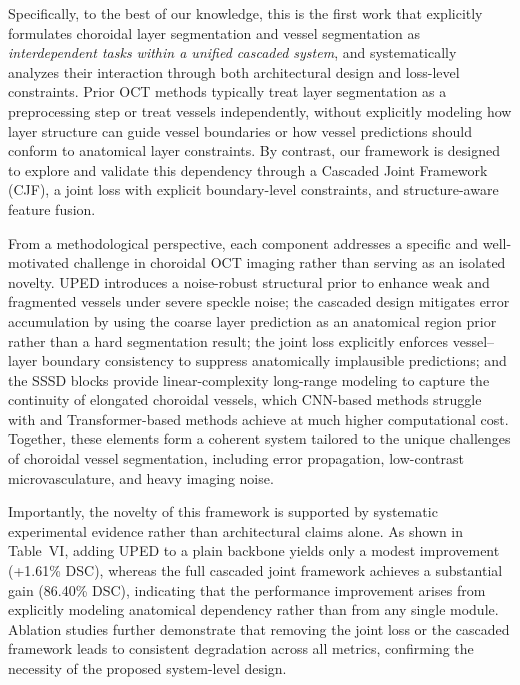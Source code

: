 \documentclass[11pt]{article}
\begin{document}
\begin{enumerate}
{    Specifically, to the best of our knowledge, this is the first work that explicitly formulates choroidal layer segmentation and vessel segmentation as \emph{interdependent tasks within a unified cascaded system}, and systematically analyzes their interaction through both architectural design and loss-level constraints.
    Prior OCT methods typically treat layer segmentation as a preprocessing step or treat vessels independently, without explicitly modeling how layer structure can guide vessel boundaries or how vessel predictions should conform to anatomical layer constraints.
    By contrast, our framework is designed to explore and validate this dependency through a Cascaded Joint Framework (CJF), a joint loss with explicit boundary-level constraints, and structure-aware feature fusion.
    
    From a methodological perspective, each component addresses a specific and well-motivated challenge in choroidal OCT imaging rather than serving as an isolated novelty.
    UPED introduces a noise-robust structural prior to enhance weak and fragmented vessels under severe speckle noise;
    the cascaded design mitigates error accumulation by using the coarse layer prediction as an anatomical region prior rather than a hard segmentation result;
    the joint loss explicitly enforces vessel–layer boundary consistency to suppress anatomically implausible predictions;
    and the SSSD blocks provide linear-complexity long-range modeling to capture the continuity of elongated choroidal vessels, which CNN-based methods struggle with and Transformer-based methods achieve at much higher computational cost.
    Together, these elements form a coherent system tailored to the unique challenges of choroidal vessel segmentation, including error propagation, low-contrast microvasculature, and heavy imaging noise.
    
    Importantly, the novelty of this framework is supported by systematic experimental evidence rather than architectural claims alone.
    As shown in Table~VI, adding UPED to a plain backbone yields only a modest improvement (+1.61\% DSC), whereas the full cascaded joint framework achieves a substantial gain (86.40\% DSC), indicating that the performance improvement arises from explicitly modeling anatomical dependency rather than from any single module.
    Ablation studies further demonstrate that removing the joint loss or the cascaded framework leads to consistent degradation across all metrics, confirming the necessity of the proposed system-level design.
    
}
\end{enumerate}
\end{document}
